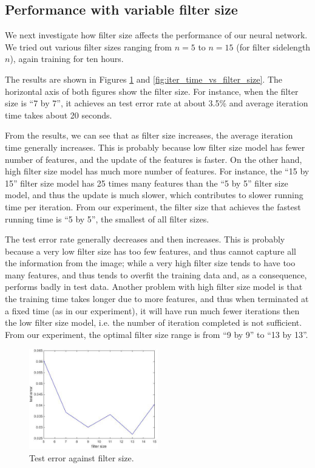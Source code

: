 \documentclass[10pt,twocolumn]{article}
\begin{document}
\subsection{Performance with variable filter size}

We next investigate how filter size affects the performance of our neural network. We tried out various filter sizes ranging from $n = 5$ to $n = 15$ (for filter sidelength $n$), again training for ten hours.

The results are shown in Figures \ref{fig:test_error_vs_filter_size} and \ref{fig:iter_time_vs_filter_size}. The horizontal axis of both figures show the filter size. For instance, when the filter size is ``7 by 7'', it achieves an test error rate at about 3.5\% and average iteration time takes about 20 seconds.

From the results, we can see that as filter size increases, the average iteration time generally increases. This is probably because low filter size model has fewer number of features, and the update of the features is faster. On the other hand, high filter size model has much more number of features. For instance, the ``15 by 15'' filter size model has 25 times many features than the ``5 by 5'' filter size model, and thus the update is much slower, which contributes to slower running time per iteration. From our experiment, the filter size that achieves the fastest running time is ``5 by 5'', the smallest of all filter sizes.

The test error rate generally decreases and then increases. This is probably because a very low filter size has too few features, and thus cannot capture all the information from the image; while a very high filter size tends to have too many features, and thus tends to overfit the training data and, as a consequence, performs badly in test data. Another problem with high filter size model is that the training time takes longer due to more features, and thus when terminated at a fixed time (as in our experiment), it will have run much fewer iterations then the low filter size model, i.e. the number of iteration completed is not sufficient. From our experiment, the optimal filter size range is from ``9 by 9'' to ``13 by 13''.

\begin{figure}
\includegraphics[width = 0.5\textwidth]{figure/test_error_vs_filter_size}
\caption{Test error against filter size.}
\label{fig:test_error_vs_filter_size}
\end{figure}
\end{document}
